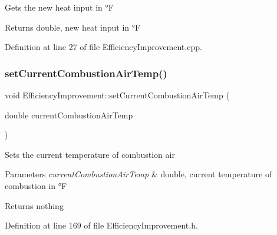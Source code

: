 Gets the new heat input in °F

\begin{DoxyReturn}{Returns}
double, new heat input in °F 
\end{DoxyReturn}


Definition at line 27 of file Efficiency\+Improvement.\+cpp.

\mbox{\label{class_efficiency_improvement_a2fba09e47828dd8e6278251be8d1fa72}} 
\subsubsection{\texorpdfstring{set\+Current\+Combustion\+Air\+Temp()}{setCurrentCombustionAirTemp()}\hspace{0.1cm}{\footnotesize\ttfamily [1/3]}}
{\footnotesize\ttfamily void Efficiency\+Improvement\+::set\+Current\+Combustion\+Air\+Temp (\begin{DoxyParamCaption}\item[{double}]{current\+Combustion\+Air\+Temp }\end{DoxyParamCaption})\hspace{0.3cm}{\ttfamily [inline]}}

Sets the current temperature of combustion air


\begin{DoxyParams}{Parameters}
{\em current\+Combustion\+Air\+Temp} & double, current temperature of combustion in °F\\
\hline
\end{DoxyParams}
\begin{DoxyReturn}{Returns}
nothing 
\end{DoxyReturn}


Definition at line 169 of file Efficiency\+Improvement.\+h.

\mbox{\label{class_efficiency_improvement_a2fba09e47828dd8e6278251be8d1fa72}} 
